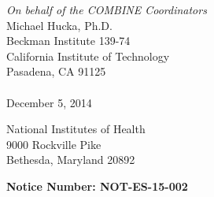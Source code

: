 \documentclass[11pt,letterpaper]{article}
\begin{document}
\thispagestyle{empty}



\hspace{4in}%
\begin{flushright}
\begin{minipage}{3in}
\emph{On behalf of the COMBINE Coordinators}\\[2pt]
Michael Hucka, Ph.D.\\
Beckman Institute 139-74\\
California Institute of Technology\\
Pasadena, CA 91125\\
\\
December 5, 2014
\end{minipage}
\end{flushright}

\vspace*{2ex}

\begin{flushleft}
National Institutes of Health\\
9000 Rockville Pike\\
Bethesda, Maryland 20892
\end{flushleft}

\setlength{\parskip}{0.7em}

\noindent
\textbf{Notice Number: NOT-ES-15-002}
\begin{flushleft}

\end{flushleft}

\clearpage


\end{document}
